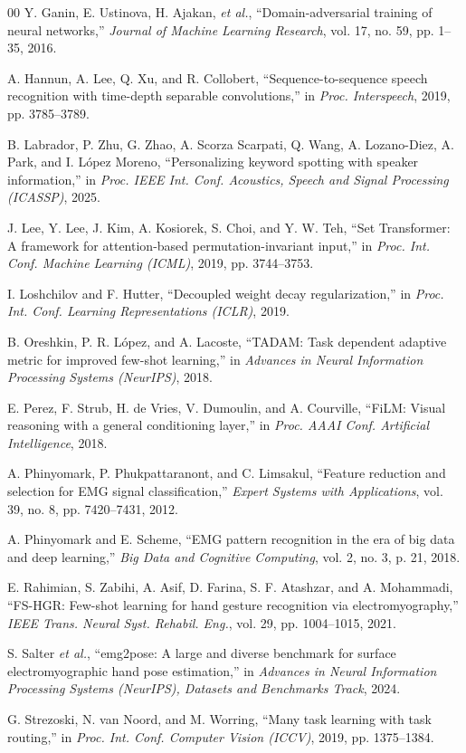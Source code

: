 \documentclass[conference]{IEEEtran}
\begin{document}
\begin{thebibliography}{00}
Y. Ganin, E. Ustinova, H. Ajakan, \emph{et al.}, ``Domain-adversarial training of neural networks,'' \emph{Journal of Machine Learning Research}, vol. 17, no. 59, pp. 1--35, 2016.

A. Hannun, A. Lee, Q. Xu, and R. Collobert, ``Sequence-to-sequence speech recognition with time-depth separable convolutions,'' in \emph{Proc. Interspeech}, 2019, pp. 3785--3789.

B. Labrador, P. Zhu, G. Zhao, A. Scorza Scarpati, Q. Wang, A. Lozano-Diez, A. Park, and I. L\'opez Moreno, ``Personalizing keyword spotting with speaker information,'' in \emph{Proc. IEEE Int. Conf. Acoustics, Speech and Signal Processing (ICASSP)}, 2025.

J. Lee, Y. Lee, J. Kim, A. Kosiorek, S. Choi, and Y. W. Teh, ``Set Transformer: A framework for attention-based permutation-invariant input,'' in \emph{Proc. Int. Conf. Machine Learning (ICML)}, 2019, pp. 3744--3753.

I. Loshchilov and F. Hutter, ``Decoupled weight decay regularization,'' in \emph{Proc. Int. Conf. Learning Representations (ICLR)}, 2019.

B. Oreshkin, P. R. L\'opez, and A. Lacoste, ``TADAM: Task dependent adaptive metric for improved few-shot learning,'' in \emph{Advances in Neural Information Processing Systems (NeurIPS)}, 2018.

E. Perez, F. Strub, H. de Vries, V. Dumoulin, and A. Courville, ``FiLM: Visual reasoning with a general conditioning layer,'' in \emph{Proc. AAAI Conf. Artificial Intelligence}, 2018.

A. Phinyomark, P. Phukpattaranont, and C. Limsakul, ``Feature reduction and selection for EMG signal classification,'' \emph{Expert Systems with Applications}, vol. 39, no. 8, pp. 7420--7431, 2012.

A. Phinyomark and E. Scheme, ``EMG pattern recognition in the era of big data and deep learning,'' \emph{Big Data and Cognitive Computing}, vol. 2, no. 3, p. 21, 2018.

E. Rahimian, S. Zabihi, A. Asif, D. Farina, S. F. Atashzar, and A. Mohammadi, ``FS-HGR: Few-shot learning for hand gesture recognition via electromyography,'' \emph{IEEE Trans. Neural Syst. Rehabil. Eng.}, vol. 29, pp. 1004--1015, 2021.

S. Salter \emph{et al.}, ``emg2pose: A large and diverse benchmark for surface electromyographic hand pose estimation,'' in \emph{Advances in Neural Information Processing Systems (NeurIPS), Datasets and Benchmarks Track}, 2024.

G. Strezoski, N. van Noord, and M. Worring, ``Many task learning with task routing,'' in \emph{Proc. Int. Conf. Computer Vision (ICCV)}, 2019, pp. 1375--1384.

\end{thebibliography}
\end{document}
